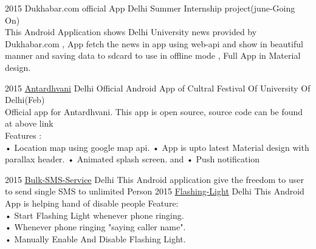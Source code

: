 \documentclass[]{friggeri-cv}
\begin{document}
\begin{entrylist}
  \entry
    {2015}
    {{Dukhabar.com official App}}
    {{Delhi}}
    {{Summer Internship project(june-Going On)} \\This Android Application shows Delhi University news
    provided by Dukhabar.com , App fetch the news in app using web-api and show in beautiful manner and saving data to sdcard to use in offline mode , Full App in Material design.}

  \entry
    {2015}
    {\href{https://github.com/teamDAPSR/Antardhvani}{Antardhvani}}
    {{Delhi}}
    {{Official Android App of Cultral Festival Of University Of Delhi(Feb)} \\Official app for Antardhvani. This app is open source, source code can be found at above link\\
    Features :\\ • Location map using google map api. • App is upto latest Material design with parallax header. • Animated splash screen. and • Push notification}

  \entry
    {2015}
    {\href{https://github.com/therajanmaurya/Bulk-SMS-Service-final}{Bulk-SMS-Service}}
    {Delhi}
    {This Android application give the freedom to user to send single SMS to unlimited Person }
  \entry
    {2015}
    {\href{https://github.com/therajanmaurya/Flashing-Light}{Flashing-Light}}
    {Delhi}
    {This Android App is helping hand of disable people
    Feature:\\• Start Flashing Light whenever phone ringing. \\
    • Whenever phone ringing "saying caller name".\\
    • Manually Enable And Disable Flashing Light. }
\end{entrylist}
\end{document}

